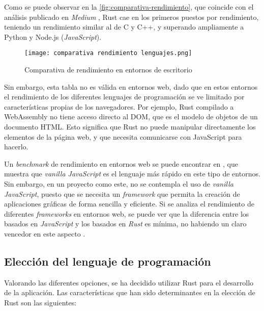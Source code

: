 Como se puede observar en la \autoref{fig:comparativa-rendimiento}, que coincide con el análisis publicado en \textit{Medium} \autocite{samTop10Fastest2024}, Rust cae en los primeros puestos por rendimiento, teniendo un rendimiento similar al de C y C++, y superando ampliamente a Python y Node.js (\textit{JavaScript}).

\begin{figure}[H]
    \centering
    \texttt{[image: comparativa rendimiento lenguajes.png]}
    \caption{Comparativa de rendimiento en entornos de escritorio \autocite{zotero-253}}
    \label{fig:comparativa-rendimiento}
\end{figure}


Sin embargo, esta tabla no es válida en entornos web, dado que en estos entornos el rendimiento de los diferentes lenguajes de programación se ve limitado por características propias de los navegadores. Por ejemplo, Rust compilado a WebAssembly no tiene acceso directo al \ac{DOM}, que es el modelo de objetos de un documento HTML. Esto significa que Rust no puede manipular directamente los elementos de la página web, y que necesita comunicarse con JavaScript para hacerlo. 

Un \textit{benchmark} de rendimiento en entornos web se puede encontrar en \autocite{InteractiveResults}, que muestra que \textit{vanilla JavaScript} es el lenguaje más rápido en este tipo de entornos. Sin embargo, en un proyecto como este, no se contempla el uso de \textit{vanilla JavaScript}, puesto que se necesita un \textit{framework} que permita la creación de aplicaciones gráficas de forma sencilla y eficiente. Si se analiza el rendimiento de diferentes \textit{frameworks} en entornos web, se puede ver que la diferencia entre los basados en \textit{JavaScript} y los basados en \textit{Rust} es mínima, no habiendo un claro vencedor en este aspecto \autocite{InteractiveResults}.

\subsection{Elección del lenguaje de programación}

Valorando las diferentes opciones, se ha decidido utilizar Rust para el desarrollo de la aplicación. Las características que han sido determinantes en la elección de Rust son las siguientes:

